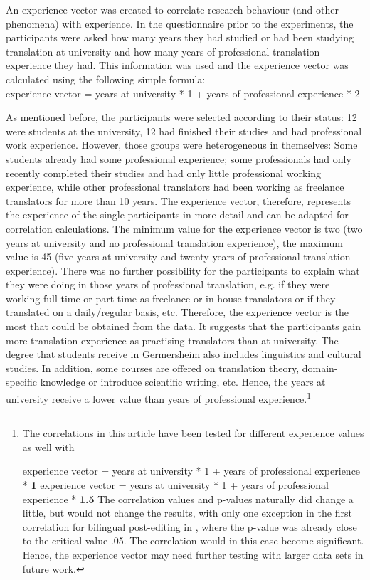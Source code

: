 \documentclass[output=paper]{langsci/langscibook}
\begin{document}
An experience vector was created to correlate research behaviour (and other phenomena) with experience. In the questionnaire prior to the experiments, the participants were asked how many years they had studied or had been studying translation at university and how many years of professional translation experience they had. This information was used and the experience vector was calculated using the following simple formula:\\

\ea
\small 
experience vector = years at university * 1 + years of professional experience * 2
\z



As mentioned before, the participants were selected according to their status: 12 were students at the university, 12 had finished their studies and had professional work experience. However, those groups were heterogeneous in themselves: Some students already had some professional experience; some professionals had only recently completed their studies and had only little professional working experience, while other professional translators had been working as freelance translators for more than 10 years. The experience vector, therefore, represents the experience of the single participants in more detail and can be adapted for correlation calculations. The minimum value for the experience vector is two (two years at university and no professional translation experience), the maximum value is 45 (five years at university and twenty years of professional translation experience). There was no further possibility for the participants to explain what they were doing in those years of professional translation, e.g. if they were working full-time or part-time as freelance or in house translators or if they translated on a daily/regular basis, etc. Therefore, the experience vector is the most that could be obtained from the data. It suggests that the participants gain more translation experience as practising translators than at university. The degree that students receive in Germersheim also includes linguistics and cultural studies. In addition, some courses are offered on translation theory, domain-specific knowledge or introduce scientific writing, etc. Hence, the years at university receive a lower value than years of professional experience.\footnote{The correlations in this article have been tested for different experience values as well with

\ea  \upshape experience vector = years at university * 1 + years of professional experience * \textbf{1}
\z
\ea   \upshape experience vector = years at university * 1 + years of professional experience *\textbf{ 1.5}
\z
The correlation values and p-values naturally did change a little, but would not change the results, with only one exception in the first correlation for bilingual post-editing in , where the p-value was already close to the critical value .05. The correlation would in this case become significant. Hence, the experience vector may need further testing with larger data sets in future work.}
\end{document}
